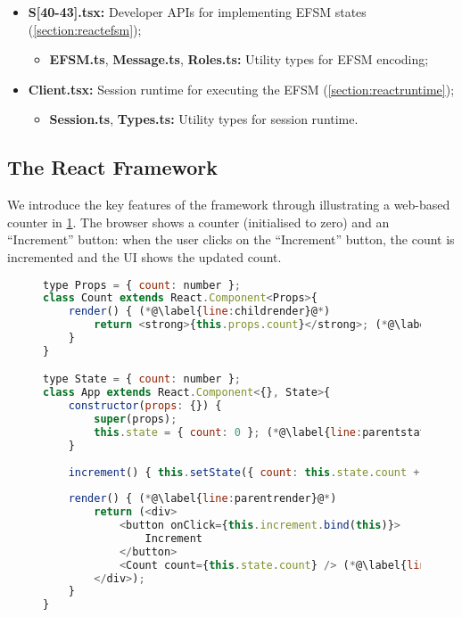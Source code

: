 \begin{itemize}

\item 
\textbf{S[40-43].tsx:}
Developer APIs for implementing EFSM states 
(\cref{section:reactefsm});

\begin{itemize}
\item
\textbf{EFSM.ts}, \textbf{Message.ts}, \textbf{Roles.ts:}
Utility types for EFSM encoding;
\end{itemize}

\item 
\textbf{Client.tsx:} 
Session runtime for executing the EFSM 
(\cref{section:reactruntime});

\begin{itemize}
\item
\textbf{Session.ts}, \textbf{Types.ts:}
Utility types for session runtime.
\end{itemize}

\end{itemize}

\subsection{The React Framework}
\label{subsection:react}

We introduce the key features of the framework
through illustrating a web-based counter in \cref{lst:counter}.
The browser shows a counter (initialised to zero) 
and an ``Increment'' button:
when the user clicks on the ``Increment'' button,
the count is incremented and the UI shows the updated count.

\begin{figure}[!h]
\begin{lstlisting}[language=javascript,tabsize=2]
type Props = { count: number };
class Count extends React.Component<Props>{
	render() { (*@\label{line:childrender}@*)
		return <strong>{this.props.count}</strong>; (*@\label{line:childprops}@*)
	}
}

type State = { count: number };
class App extends React.Component<{}, State>{
	constructor(props: {}) {
		super(props);
		this.state = { count: 0 }; (*@\label{line:parentstate}@*)
	}
	
	increment() { this.setState({ count: this.state.count + 1 }); (*@\label{line:parentsetstate}@*)
	
	render() { (*@\label{line:parentrender}@*)
		return (<div>
			<button onClick={this.increment.bind(this)}>
				Increment
			</button>
			<Count count={this.state.count} /> (*@\label{line:childcomponent}@*)
		</div>);	
	}
}
\end{lstlisting}
\label{lst:counter}
\end{figure}

